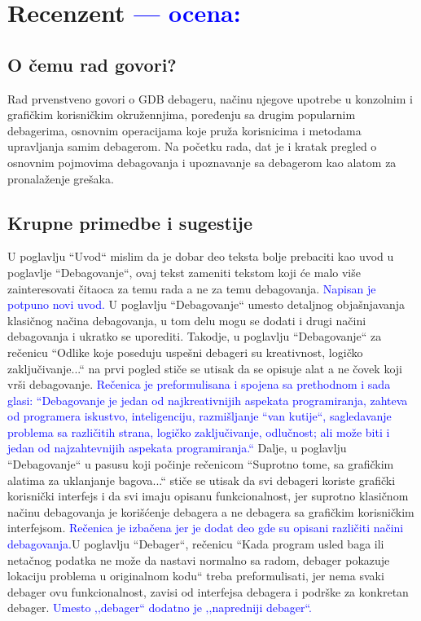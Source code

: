 \documentclass[a4paper]{report}
\newcommand{\odgovor}[1]{\textcolor{blue}{#1}}
\begin{document}
\chapter{Recenzent \odgovor{--- ocena:} }


\section{O čemu rad govori?}
Rad prvenstveno govori o GDB debageru, načinu njegove upotrebe u konzolnim i grafičkim korisničkim okružennjima, poređenju sa drugim popularnim debagerima, osnovnim operacijama koje pruža korisnicima i metodama upravljanja samim debagerom. Na početku rada, dat je i kratak pregled o osnovnim pojmovima debagovanja i upoznavanje sa debagerom kao alatom za pronalaženje grešaka.

\section{Krupne primedbe i sugestije}
U poglavlju ``Uvod`` mislim da je dobar deo teksta bolje prebaciti kao uvod u poglavlje ``Debagovanje``, ovaj tekst zameniti tekstom koji će malo više zainteresovati čitaoca za temu rada a ne za temu debagovanja. 
 \odgovor{Napisan je potpuno novi uvod.}
U poglavlju  ``Debagovanje`` umesto detaljnog objašnjavanja klasičnog načina debagovanja, u tom delu mogu se dodati i drugi načini debagovanja i ukratko se uporediti. Takodje, u poglavlju ``Debagovanje`` za rečenicu ``Odlike koje poseduju uspešni debageri su kreativnost, logičko zaključivanje...`` na prvi pogled stiče se utisak da se opisuje alat a ne čovek koji vrši debagovanje. \odgovor{Rečenica je preformulisana i spojena sa prethodnom i sada glasi: ``Debagovanje je jedan od najkreativnijih aspekata programiranja, zahteva od programera iskustvo,
inteligenciju, razmišljanje ``van kutije``, sagledavanje problema sa različitih strana, logičko zaključivanje, odlučnost;  
ali može biti i jedan od najzahtevnijih aspekata programiranja.``}  Dalje, u poglavlju ``Debagovanje`` u pasusu koji počinje rečenicom ``Suprotno tome, sa grafičkim alatima za uklanjanje bagova...`` stiče se utisak da svi debageri koriste grafički korisnički interfejs i da svi imaju opisanu funkcionalnost, jer suprotno klasičnom načinu debagovanja je korišćenje debagera a ne debagera sa grafičkim korisničkim interfejsom.  \odgovor{Rečenica je izbačena jer je dodat deo gde su opisani različiti načini debagovanja.}U poglavlju ``Debager``, rečenicu ``Kada program usled baga ili netačnog podatka ne može da nastavi normalno sa radom, debager pokazuje lokaciju problema u originalnom kodu`` treba preformulisati, jer nema svaki debager ovu funkcionalnost, zavisi od interfejsa debagera i podrške za konkretan debager.
\odgovor{Umesto ‚‚debager`` dodatno je ‚‚napredniji debager``.}
\end{document}
